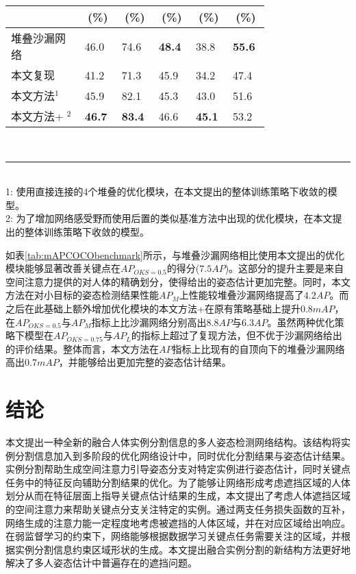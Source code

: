 \begin{outstandingabstract}
\begin{table*}[ht]
\begin{minipage}[t]{0.8\linewidth}
\begin{tabular}{p{0.25\linewidth}p{0.1\linewidth}<{\centering}p{0.1\linewidth}<{\centering}p{0.1\linewidth}<{\centering}p{0.1\linewidth}<{\centering}p{0.1\linewidth}<{\centering}}
    			& \multicolumn{1}{c}{(\%)}& \multicolumn{1}{c}{(\%)}&
    			\multicolumn{1}{c}{(\%)}& \multicolumn{1}{c}{(\%)}& \multicolumn{1}{c}{
    				(\%)}\\
    			\hline
    			堆叠沙漏网络\cite{newell2016stacked} & 46.0 & 74.6 & \textbf{48.4} & 38.8  & \textbf{55.6} \\
    			本文复现 & 41.2 & 71.3 & 45.9 & 34.2 & 47.4 \\
    			本文方法$^1$ & 45.9 & 82.1 & 45.3 & 43.0 & 51.6 \\
    			本文方法+ $^2$ & \textbf{46.7} & \textbf{83.4} & 46.6 & \textbf{45.1} & 53.2 \\
    			\hline
    		\end{tabular}\\[2pt]
    		\noindent\rule{0.25\linewidth}{1pt} \\
    		\footnotesize
    		1: 使用直接连接的4个堆叠的优化模块，在本文提出的整体训练策略下收敛的模型。\\
    		2: 为了增加网络感受野而使用后置的类似基准方法中出现的优化模块，在本文提出的整体训练策略下收敛的模型。
    	\end{minipage}
    \end{table*}

	如表\ref{tab:mAPCOCObenchmark}所示，与堆叠沙漏网络相比使用本文提出的优化模块能够显著改善关键点在$AP_{OKS=0.5}$的得分($7.5AP$)。这部分的提升主要是来自空间注意力提供的对人体的精确划分，使得给出的姿态估计更加完整。同时，本文方法在对小目标的姿态检测结果性能$AP_M$上性能较堆叠沙漏网络提高了$4.2AP$。而之后在此基础上额外增加优化模块的本文方法+在原有策略基础上提升$0.8mAP$，在$AP_{OKS=0.5}$与$AP_M$指标上比沙漏网络分别高出$8.8AP$与$6.3AP$。虽然两种优化策略下模型在$AP_{OKS=0.75}$与$AP_L$的指标上超过了复现方法，但不优于沙漏网络给出的评价结果。整体而言，本文方法在$AP$指标上比现有的自顶向下的堆叠沙漏网络高出$0.7mAP$，并能够给出更加完整的姿态估计结果。
	
	\section{结论}
	本文提出一种全新的融合人体实例分割信息的多人姿态检测网络结构。该结构将实例分割信息加入到多阶段的优化网络设计中，同时优化分割结果与姿态估计结果。实例分割帮助生成空间注意力引导姿态分支对特定实例进行姿态估计，同时关键点任务中的特征反向辅助分割结果的优化。为了能够让网络形成考虑遮挡区域的人体划分从而在特征层面上指导关键点估计结果的生成，本文提出了考虑人体遮挡区域的空间注意力来帮助关键点分支关注特定的实例。通过两支任务损失函数的互补，网络生成的注意力能一定程度地考虑被遮挡的人体区域，并在对应区域给出响应。在弱监督学习的约束下，网络能够根据数据学习关键点任务需要关注的区域，并根据实例分割信息约束区域形状的生成。本文提出融合实例分割的新结构方法更好地解决了多人姿态估计中普遍存在的遮挡问题。
    
    
\end{outstandingabstract}